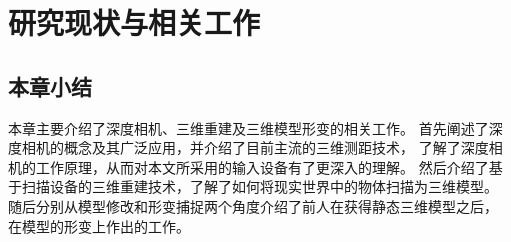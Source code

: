 \chapter{研究现状与相关工作}






\section{本章小结}
本章主要介绍了深度相机、三维重建及三维模型形变的相关工作。
首先阐述了深度相机的概念及其广泛应用，并介绍了目前主流的三维测距技术，
了解了深度相机的工作原理，从而对本文所采用的输入设备有了更深入的理解。
然后介绍了基于扫描设备的三维重建技术，了解了如何将现实世界中的物体扫描为三维模型。
随后分别从模型修改和形变捕捉两个角度介绍了前人在获得静态三维模型之后，
在模型的形变上作出的工作。

